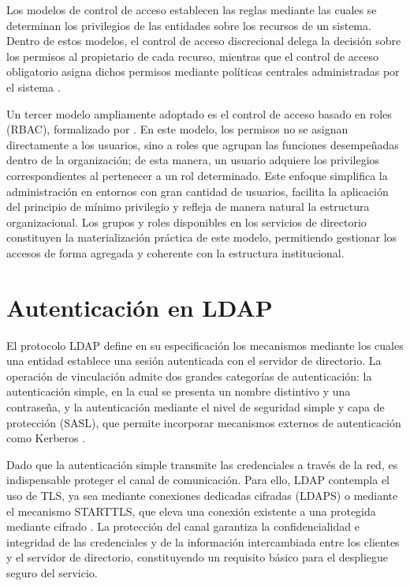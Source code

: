 Los modelos de control de acceso establecen las reglas mediante las cuales se determinan los privilegios de las entidades sobre los recursos de un sistema. Dentro de estos modelos, el control de acceso discrecional delega la decisión sobre los permisos al propietario de cada recurso, mientras que el control de acceso obligatorio asigna dichos permisos mediante políticas centrales administradas por el sistema \citep{RFC4949}.

Un tercer modelo ampliamente adoptado es el control de acceso basado en roles (\acs{RBAC}), formalizado por \citet{Sandhu1996}. En este modelo, los permisos no se asignan directamente a los usuarios, sino a roles que agrupan las funciones desempeñadas dentro de la organización; de esta manera, un usuario adquiere los privilegios correspondientes al pertenecer a un rol determinado. Este enfoque simplifica la administración en entornos con gran cantidad de usuarios, facilita la aplicación del principio de mínimo privilegio y refleja de manera natural la estructura organizacional. Los grupos y roles disponibles en los servicios de directorio constituyen la materialización práctica de este modelo, permitiendo gestionar los accesos de forma agregada y coherente con la estructura institucional.

\section{Autenticación en \texorpdfstring{\acs{LDAP}}{LDAP}}

El protocolo \acs{LDAP} define en su especificación los mecanismos mediante los cuales una entidad establece una sesión autenticada con el servidor de directorio. La operación de vinculación admite dos grandes categorías de autenticación: la autenticación simple, en la cual se presenta un nombre distintivo y una contraseña, y la autenticación mediante el nivel de seguridad simple y capa de protección (\acs{SASL}), que permite incorporar mecanismos externos de autenticación como Kerberos \citep{RFC4513}.

Dado que la autenticación simple transmite las credenciales a través de la red, es indispensable proteger el canal de comunicación. Para ello, \acs{LDAP} contempla el uso de \acs{TLS}, ya sea mediante conexiones dedicadas cifradas (\acs{LDAPS}) o mediante el mecanismo STARTTLS, que eleva una conexión existente a una protegida mediante cifrado \citep{RFC4513}. La protección del canal garantiza la confidencialidad e integridad de las credenciales y de la información intercambiada entre los clientes y el servidor de directorio, constituyendo un requisito básico para el despliegue seguro del servicio.

